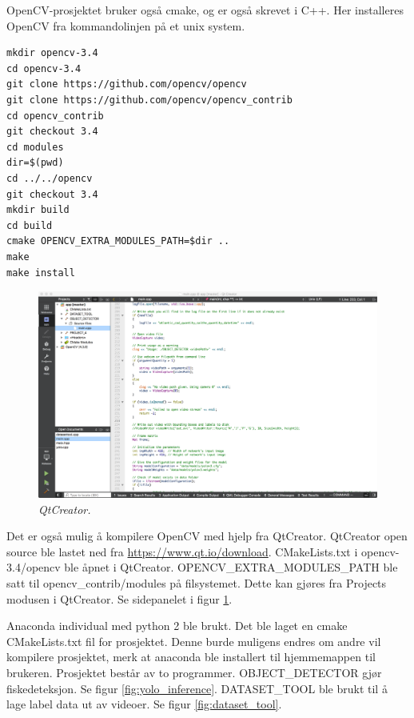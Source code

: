 OpenCV-prosjektet bruker også cmake, og er også skrevet i C++. Her installeres OpenCV fra kommandolinjen på et unix system.

\begin{verbatim}
mkdir opencv-3.4
cd opencv-3.4
git clone https://github.com/opencv/opencv
git clone https://github.com/opencv/opencv_contrib
cd opencv_contrib
git checkout 3.4
cd modules
dir=$(pwd)
cd ../../opencv
git checkout 3.4
mkdir build
cd build
cmake OPENCV_EXTRA_MODULES_PATH=$dir ..
make
make install
\end{verbatim}

\begin{figure}
\begin{center} 
\includegraphics[scale=0.2]{figures/qtcreator}
\caption{\small \sl QtCreator. \label{fig:qtcreator}} 
\end{center} 
\end{figure} 

Det er også mulig å kompilere OpenCV med hjelp fra QtCreator. QtCreator open source ble lastet ned fra \url{https://www.qt.io/download}. CMakeLists.txt i opencv-3.4/opencv ble åpnet i QtCreator. OPENCV\_EXTRA\_MODULES\_PATH ble satt til opencv\_contrib/modules på filsystemet. Dette kan gjøres fra Projects modusen i QtCreator. Se sidepanelet i figur \ref{fig:qtcreator}.

Anaconda individual med python 2 ble brukt. Det ble laget en cmake CMakeLists.txt fil for prosjektet. Denne burde muligens endres om andre vil kompilere prosjektet, merk at anaconda ble installert til hjemmemappen til brukeren. Prosjektet består av to programmer. OBJECT\_DETECTOR gjør fiskedeteksjon. Se figur \ref{fig:yolo_inference}. DATASET\_TOOL ble brukt til å lage label data ut av videoer. Se figur \ref{fig:dataset_tool}.

